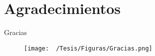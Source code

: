 \chapter*{Agradecimientos}
Gracias
\begin{figure}[h]
  \begin{center}
	\texttt{[image: ~/Tesis/Figuras/Gracias.png]}
  \end{center}
\end{figure}
